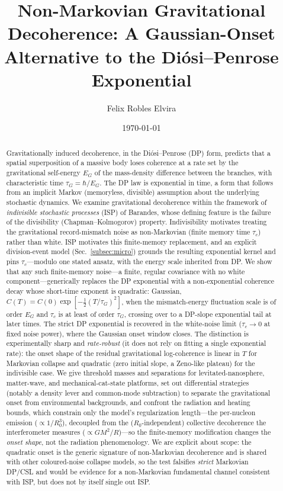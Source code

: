 \documentclass[aps,prd,onecolumn,amsmath,amssymb,nofootinbib,superscriptaddress]{revtex4-2}
\begin{document}
\title{Non-Markovian Gravitational Decoherence: A Gaussian-Onset Alternative to the
Di\'osi--Penrose Exponential}

\author{Felix Robles Elvira}
\noaffiliation

\date{\today}

\begin{abstract}
Gravitationally induced decoherence, in the Di\'osi--Penrose (DP) form, predicts that a spatial
superposition of a massive body loses coherence at a rate set by the gravitational self-energy
$E_G$ of the mass-density difference between the branches, with characteristic time
$\tau_G=\hbar/E_G$. The DP law is exponential in time, a form that follows from an implicit
Markov (memoryless, divisible) assumption about the underlying stochastic dynamics. We examine
gravitational decoherence within the framework of \emph{indivisible stochastic processes} (ISP)
of Barandes, whose defining feature is the failure of the divisibility (Chapman--Kolmogorov)
property. Indivisibility motivates treating the gravitational record-mismatch noise as
non-Markovian (finite memory time $\tau_c$) rather than white. ISP motivates this finite-memory
replacement, and an explicit division-event model (Sec.~\ref{subsec:micro}) grounds the resulting
exponential kernel and pins $\tau_c$---modulo one stated ansatz, with the energy scale inherited
from DP. We show
that any such finite-memory noise---a finite, regular covariance with no white component---generically
replaces the DP exponential with a non-exponential coherence decay whose short-time exponent is
quadratic: Gaussian, $C(T)=C(0)\exp[-\tfrac12(T/\tau_G)^2]$, when the mismatch-energy fluctuation
scale is of order $E_G$ and $\tau_c$ is at least of order $\tau_G$, crossing over to a DP-slope
exponential tail at later times. The strict DP exponential is recovered in the white-noise limit
($\tau_c\to0$ at fixed noise power), where the Gaussian onset window closes. The distinction is
experimentally sharp and \emph{rate-robust} (it does not rely on fitting a single exponential
rate): the onset shape of the residual gravitational log-coherence is linear in $T$ for Markovian
collapse and quadratic (zero initial slope, a Zeno-like plateau) for the indivisible case. We give
threshold masses and separations for levitated-nanosphere, matter-wave, and mechanical-cat-state
platforms, set out differential strategies (notably a density lever and common-mode subtraction) to
separate the gravitational onset from environmental backgrounds, and confront the radiation and heating
bounds, which constrain only the model's regularization length---the per-nucleon emission
($\propto 1/R_0^3$), decoupled from the ($R_0$-independent) collective decoherence the interferometer
measures ($\propto GM^2/R$)---so the finite-memory modification changes the \emph{onset shape}, not the
radiation phenomenology. We are explicit about scope: the quadratic onset is the
generic signature of non-Markovian decoherence and is shared with other coloured-noise collapse
models, so the test falsifies \emph{strict} Markovian DP/CSL and would be evidence for a
non-Markovian fundamental channel consistent with ISP, but does not by itself single out ISP.
\end{abstract}
\end{document}
